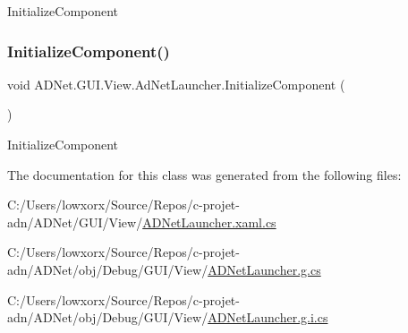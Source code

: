Initialize\+Component 

\mbox{\label{class_a_d_net_1_1_g_u_i_1_1_view_1_1_ad_net_launcher_a259a76fc00d3f31ea4d8290a49743bd2}} 
\subsubsection{\texorpdfstring{Initialize\+Component()}{InitializeComponent()}\hspace{0.1cm}{\footnotesize\ttfamily [2/2]}}
{\footnotesize\ttfamily void A\+D\+Net.\+G\+U\+I.\+View.\+Ad\+Net\+Launcher.\+Initialize\+Component (\begin{DoxyParamCaption}{ }\end{DoxyParamCaption})}



Initialize\+Component 



The documentation for this class was generated from the following files\+:\begin{DoxyCompactItemize}
\item 
C\+:/\+Users/lowxorx/\+Source/\+Repos/c-\/projet-\/adn/\+A\+D\+Net/\+G\+U\+I/\+View/\hyperlink{_a_d_net_launcher_8xaml_8cs}{A\+D\+Net\+Launcher.\+xaml.\+cs}\item 
C\+:/\+Users/lowxorx/\+Source/\+Repos/c-\/projet-\/adn/\+A\+D\+Net/obj/\+Debug/\+G\+U\+I/\+View/\hyperlink{_a_d_net_launcher_8g_8cs}{A\+D\+Net\+Launcher.\+g.\+cs}\item 
C\+:/\+Users/lowxorx/\+Source/\+Repos/c-\/projet-\/adn/\+A\+D\+Net/obj/\+Debug/\+G\+U\+I/\+View/\hyperlink{_a_d_net_launcher_8g_8i_8cs}{A\+D\+Net\+Launcher.\+g.\+i.\+cs}\end{DoxyCompactItemize}
